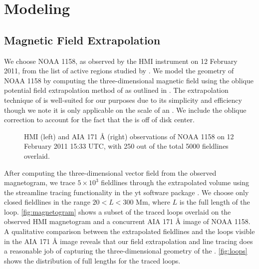 \section{Modeling}\label{modeling}

\subsection{Magnetic Field Extrapolation}\label{field}

We choose \AR{} NOAA 1158, as observed by the HMI instrument \citet{hoeksema_helioseismic_2014} on 12 February 2011, from the list of active regions studied by \citet{warren_systematic_2012}. We model the geometry of \AR{} NOAA 1158 by computing the three-dimensional magnetic field using the oblique potential field extrapolation method of \citet{schmidt_observable_1964} as outlined in \citet[section 3]{sakurai_greens_1982}. The extrapolation technique of \citeauthor{schmidt_observable_1964} is well-suited for our purposes due to its simplicity and efficiency though we note it is only applicable on the scale of an \AR{}. We include the oblique correction to account for the fact that the \AR{} is off of disk center.

\begin{figure*}
    \caption{HMI (left) and AIA 171 \AA{} (right) observations of \AR{} NOAA 1158 on 12 February 2011 15:33 UTC, with 250 out of the total 5000 fieldlines overlaid.}
    \label{fig:magnetogram}
\end{figure*}

After computing the three-dimensional vector field from the observed magnetogram, we trace $5\times10^3$ fieldlines through the extrapolated volume using the streamline tracing functionality in the yt software package \citep{turk_yt_2011}. We choose only closed fieldlines in the range $20<L<300$ Mm, where $L$ is the full length of the loop. \autoref{fig:magnetogram} shows a subset of the traced loops overlaid on the observed HMI magnetogram and a concurrent AIA 171 \AA{} image of NOAA 1158. A qualitative comparison between the extrapolated fieldlines and the loops visible in the AIA 171 \AA{} image reveals that our field extrapolation and line tracing does a reasonable job of capturing the three-dimensional geometry of the \AR{}. \autoref{fig:loops} shows the distribution of full lengths for the traced loops.

